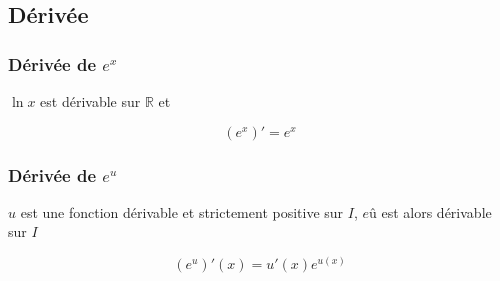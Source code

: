 \documentclass[a4paper]{article}
\begin{document}
\subsection{Dérivée}
\subsubsection{Dérivée de $e^x$}

{$\ln{x}$ est dérivable sur $\mathbb{R}$ et}

\[(e^x)\prime=e^x\]

\subsubsection{Dérivée de $e^u$}

{$u$ est une fonction dérivable et strictement positive sur $I$, $eû$ est alors dérivable sur $I$}

\[(e^u)\prime(x)=u\prime(x)e^{u(x)}\]
\end{document}
